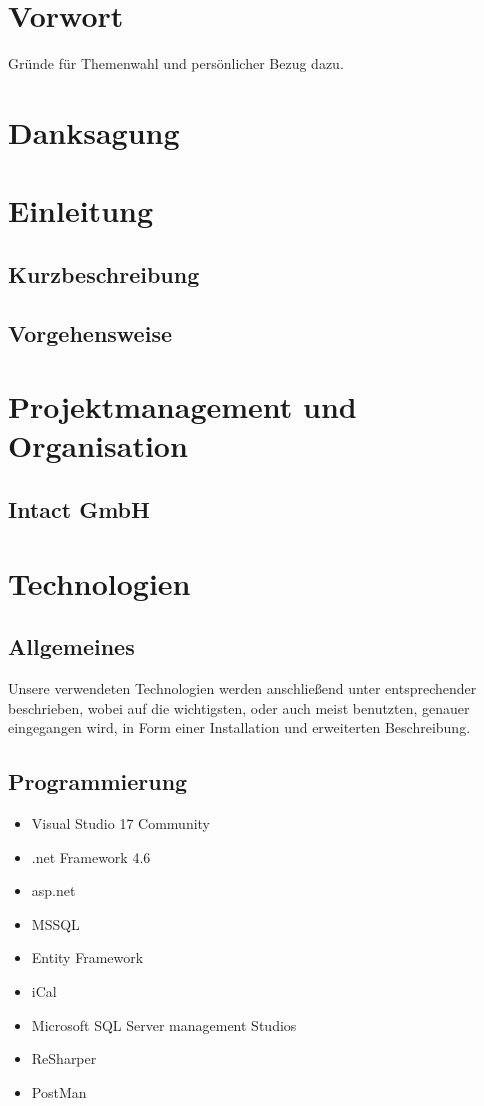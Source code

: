\documentclass[11pt]{scrartcl}
\begin{document}
\section*{Vorwort}
\label{sec:vorwort}
Gründe für Themenwahl und persönlicher Bezug dazu.

\newpage
	\tableofcontents
\newpage

\section*{Danksagung}
\label{sec:danksagung}


\section{Einleitung}
\label{sec:einleitung}
\subsection{Kurzbeschreibung}
\label{sec:kurzbeschreibung}
\subsection{Vorgehensweise}
\label{sec:vorgehensweise}

\section{Projektmanagement und Organisation}
\label{sec:projektmanagement-und-organisation}
\subsection{Intact GmbH}
\label{sec:intact-gmbh}

\section{Technologien}
\subsection{Allgemeines}
Unsere verwendeten Technologien werden anschließend unter entsprechender beschrieben, wobei auf die wichtigsten, oder auch meist benutzten, genauer eingegangen wird, in Form einer Installation und erweiterten Beschreibung.
\subsection{Programmierung}
\begin{itemize}
\item Visual Studio 17 Community
\item .net Framework 4.6
\item asp.net
\item MSSQL
\item Entity Framework
\item iCal
\item Microsoft SQL Server management Studios
\item ReSharper
\item PostMan
\end{itemize}
\end{document}
